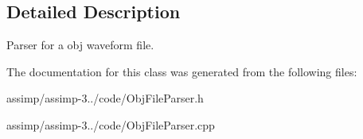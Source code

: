 \subsection{Detailed Description}
Parser for a obj waveform file. 

The documentation for this class was generated from the following files\+:\begin{DoxyCompactItemize}
\item 
assimp/assimp-\/3../code/Obj\+File\+Parser.\+h\item 
assimp/assimp-\/3../code/Obj\+File\+Parser.\+cpp\end{DoxyCompactItemize}

